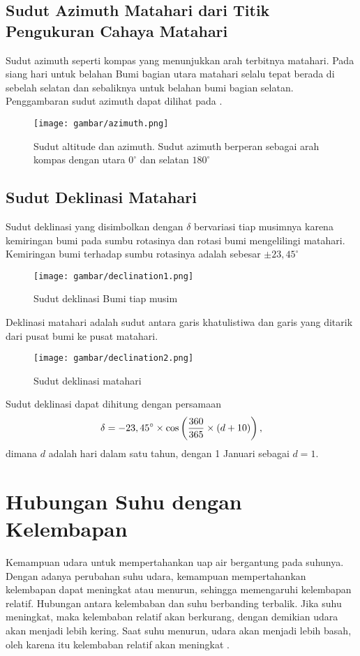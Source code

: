 \subsection{Sudut Azimuth Matahari dari Titik Pengukuran Cahaya Matahari}
Sudut azimuth seperti kompas yang menunjukkan arah terbitnya matahari. Pada siang hari untuk belahan Bumi bagian utara matahari selalu tepat berada di sebelah selatan dan sebaliknya untuk belahan bumi bagian selatan. Penggambaran sudut azimuth dapat dilihat pada .
\begin{figure}[H]
    \centering
    \texttt{[image: gambar/azimuth.png]}
    \caption{Sudut altitude dan azimuth. Sudut azimuth berperan sebagai arah kompas dengan utara $0^\circ$ dan selatan $180^\circ$}
\end{figure}

\subsection{Sudut Deklinasi Matahari}
Sudut deklinasi yang disimbolkan dengan $\delta$ bervariasi tiap musimnya karena kemiringan bumi pada sumbu rotasinya dan rotasi bumi mengelilingi matahari. Kemiringan bumi terhadap sumbu rotasinya adalah sebesar $\pm 23,45^\circ$
\begin{figure}[H]
    \centering
    \texttt{[image: gambar/declination1.png]}
    \caption{Sudut deklinasi Bumi tiap musim }
\end{figure}
Deklinasi matahari adalah sudut antara garis khatulistiwa dan garis yang ditarik dari pusat bumi ke pusat matahari.
\begin{figure}[H]
    \centering
    \texttt{[image: gambar/declination2.png]}
    \caption{Sudut deklinasi matahari}
\end{figure}
Sudut deklinasi dapat dihitung dengan persamaan
\begin{equation*}
    \delta = -23,45^\circ \times \cos\left({\frac{360}{365}\times \left({d+10}\right)}\right),
\end{equation*}
dimana $d$ adalah hari dalam satu tahun, dengan 1 Januari sebagai $d=1$.

\section{Hubungan Suhu dengan Kelembapan}
Kemampuan udara untuk mempertahankan uap air bergantung pada suhunya. Dengan adanya perubahan suhu udara, kemampuan mempertahankan kelembapan dapat meningkat atau menurun, sehingga memengaruhi kelembapan relatif. Hubungan antara kelembaban dan suhu berbanding terbalik. Jika suhu meningkat, maka kelembaban relatif akan berkurang, dengan demikian udara akan menjadi lebih kering. Saat suhu menurun, udara akan menjadi lebih basah, oleh karena itu kelembaban relatif akan meningkat \cite{widhiada2019robust}.

